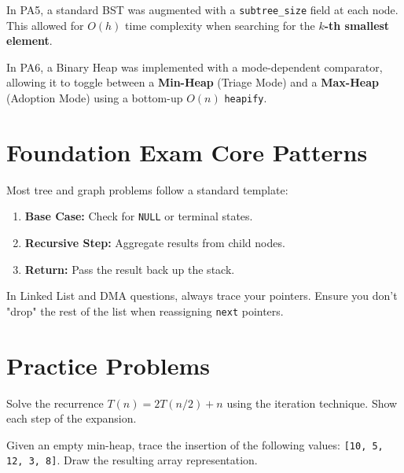 \begin{example}
    In PA5, a standard BST was augmented with a \texttt{subtree\_size} field at each node. This allowed for $O(h)$ time complexity when searching for the \textbf{$k$-th smallest element}.
\end{example}

\begin{example}
    In PA6, a Binary Heap was implemented with a mode-dependent comparator, allowing it to toggle between a \textbf{Min-Heap} (Triage Mode) and a \textbf{Max-Heap} (Adoption Mode) using a bottom-up $O(n)$ \texttt{heapify}.
\end{example}

\section{Foundation Exam Core Patterns}

\begin{remark}
    Most tree and graph problems follow a standard template:
    \begin{enumerate}
        \item \textbf{Base Case:} Check for \texttt{NULL} or terminal states.
        \item \textbf{Recursive Step:} Aggregate results from child nodes.
        \item \textbf{Return:} Pass the result back up the stack.
    \end{enumerate}
\end{remark}

\begin{remark}
    In Linked List and DMA questions, always trace your pointers. Ensure you don't "drop" the rest of the list when reassigning \texttt{next} pointers.
\end{remark}

\section{Practice Problems}

\begin{exercise}
    Solve the recurrence $T(n) = 2T(n/2) + n$ using the iteration technique. Show each step of the expansion.
\end{exercise}

\begin{exercise}
    Given an empty min-heap, trace the insertion of the following values: \texttt{[10, 5, 12, 3, 8]}. Draw the resulting array representation.
\end{exercise}

